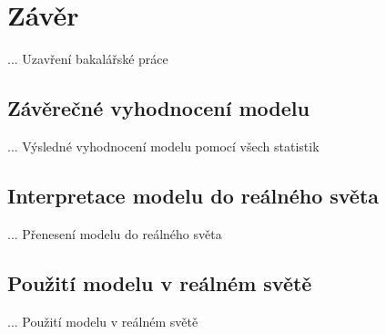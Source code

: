 \chapter{Závěr}
... Uzavření bakalářské práce

\section{Závěrečné vyhodnocení modelu}
... Výsledné vyhodnocení modelu pomocí všech statistik

\section{Interpretace modelu do reálného světa}
... Přenesení modelu do reálného světa

\section{Použití modelu v reálném světě}
... Použití modelu v reálném světě

\section{}